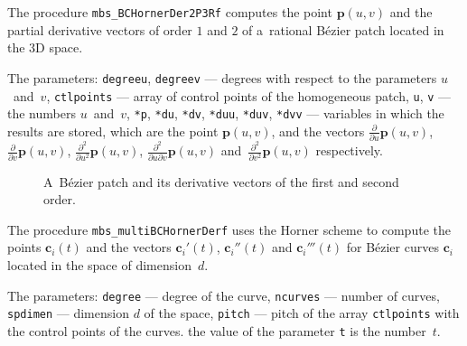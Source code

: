 \vspace{\bigskipamount}
The procedure \texttt{mbs\_BCHornerDer2P3Rf} computes the point $\bm{p}(u,v)$
and the partial derivative vectors of order $1$ and $2$
of a~rational B\'{e}zier patch located in the $3$D space.

The parameters: \texttt{degreeu}, \texttt{degreev} --- degrees with respect to
the parameters $u$~and~$v$, \texttt{ctlpoints} --- array of control points of
the homogeneous patch, \texttt{u}, \texttt{v} --- the numbers
$u$~and~$v$, \texttt{*p}, \texttt{*du}, \texttt{*dv}, \texttt{*duu}, \texttt{*duv},
\texttt{*dvv} --- variables in which the results are stored, which are
the point $\bm{p}(u,v)$, and the vectors $\frac{\partial}{\partial u}\bm{p}(u,v)$,
$\frac{\partial}{\partial v}\bm{p}(u,v)$,
$\frac{\partial^2}{\partial u^2}\bm{p}(u,v)$,
$\frac{\partial^2}{\partial u\partial v}\bm{p}(u,v)$
and~$\frac{\partial^2}{\partial v^2}\bm{p}(u,v)$ respectively.%
\begin{figure}[ht]
  \centerline{}
  \caption{A~B\'{e}zier patch and its derivative vectors of the
    first and second order.}
\end{figure}

\vspace{\bigskipamount}
\begin{sloppypar}
The procedure \texttt{mbs\_multiBCHornerDerf} uses the Horner scheme
to compute the points $\bm{c}_i(t)$ and the vectors $\bm{c}_i'(t)$,
$\bm{c}_i''(t)$ and $\bm{c}_i'''(t)$ for B\'{e}zier curves $\bm{c}_i$
located in the space of dimension~$d$.
\end{sloppypar}

The parameters: \texttt{degree} --- degree of the curve, \texttt{ncurves}
--- number of curves, \texttt{spdimen} --- dimension $d$ of the space,
\texttt{pitch} --- pitch of the array \texttt{ctlpoints} with the control
points of the curves. the value of the parameter \texttt{t}
is the number~$t$.

